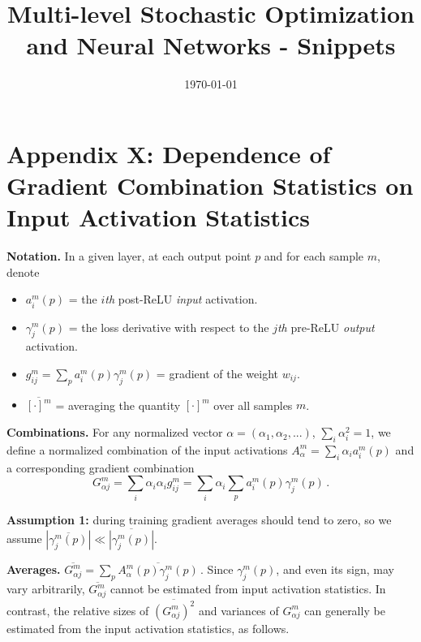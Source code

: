 \documentclass{article} %
\title{Multi-level Stochastic Optimization and Neural Networks - Snippets}
\date{\today}
\begin{document}



\newpage
\section{Appendix X: Dependence of Gradient Combination Statistics on Input Activation Statistics}
\label{sec:x}

{\bf Notation.} In a given layer, at each output point $p$ and for each sample $m$, denote
\begin{itemize}
    \item $a^m_i(p)$ = the $i${\it th} post-ReLU {\it input} activation.
    \item $\gamma^m_j(p)$ = the loss derivative with respect to the $j${\it th} pre-ReLU
    {\it output} activation.
    \item $g^m_{ij} = \sum_p a^m_i(p) \gamma^m_j(p)$ = gradient of the weight $w_{ij}$.
    \item $\overline{[\cdot]^m}$ = averaging the quantity $[\cdot]^m$ over all samples $m$.
\end{itemize}

{\bf Combinations.} For any normalized vector $\alpha = (\alpha_1, \alpha_2, ...)$, $\sum_i \alpha_i^2 = 1$, we define a normalized combination of the input activations $A^m_{\alpha} = \sum_i \alpha_i a^m_i(p)$ and a corresponding gradient combination
$$ G^m_{\alpha j} = \sum_i \alpha_i \alpha_i g^m_{ij} = \sum_i \alpha_i \sum_p a^m_i(p) \gamma^m_j(p)\,.$$

{\bf Assumption 1:} during training gradient averages should tend to zero, so we assume $|\overline{\gamma^m_j(p)}| \ll \overline{|\gamma^m_j(p)|}$.

{\bf Averages.} $\overline{G^m_{\alpha j}} = \sum_p \overline{A^m_{\alpha}(p) \gamma^m_j(p)}\,.$
Since $\gamma^m_j(p)$, and even its sign, may vary arbitrarily, $\overline{G^m_{\alpha j}}$ cannot be estimated from input activation statistics. In contrast, the relative sizes of $\overline{(G^m_{\alpha j})^2}$ and variances of $G^m_{\alpha j}$ can generally be estimated from the input activation statistics, as follows.
\end{document}
